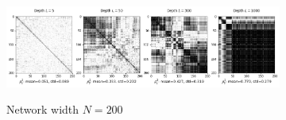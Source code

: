 \begin{figure}
\centering
\newcommand{\myWidth}{0.9\textwidth}

\begin{subfigure}{\myWidth}
  \centering
  \caption{Network width $N=200$}
  \includegraphics[width=1.0\linewidth]{mnist_FixN=200}
  \label{fig:sec4_sim3_a}
\end{subfigure}\hspace{3mm}%
\begin{subfigure}{7mm}
  \centering

\end{subfigure}
\end{figure}
